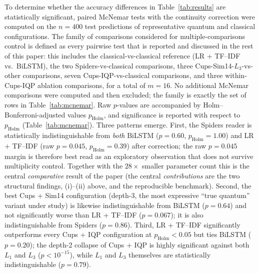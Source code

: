\documentclass[11pt, a4paper]{article}
\begin{document}
To determine whether the accuracy differences in
Table~\ref{tab:results} are statistically significant, paired McNemar
tests \citep{mcnemar1947} with the continuity correction were
computed on the \(n=400\) test predictions of representative
quantum and classical configurations. The family of comparisons
considered for multiple-comparisons control is defined as every
pairwise test that is reported and discussed in the rest of this
paper: this includes the classical-vs-classical reference
(LR + TF--IDF vs.\ BiLSTM), the two Spiders-vs-classical
comparisons, three Cups-Sim14-\(L_3\)-vs-other comparisons, seven
Cups-IQP-vs-classical comparisons, and three within-Cups-IQP
ablation comparisons, for a total of \(m=16\). No additional
McNemar comparisons were computed and then excluded; the family is
exactly the set of rows in Table~\ref{tab:mcnemar}. Raw
\(p\)-values are accompanied by Holm--Bonferroni-adjusted values
\(p_{\text{Holm}}\), and significance is reported with respect to
\(p_{\text{Holm}}\) (Table~\ref{tab:mcnemar}). Three
patterns emerge. First, the Spiders reader is statistically
indistinguishable from \emph{both} BiLSTM (\(p=0.60\),
\(p_{\text{Holm}}=1.00\)) and LR + TF--IDF (raw \(p=0.045\),
\(p_{\text{Holm}}=0.39\)) after correction; the raw \(p=0.045\)
margin is therefore best read as an exploratory observation that
does not survive multiplicity control. Together with the
\(28\times\) smaller parameter count this is the central
\emph{comparative} result of the paper (the central
\emph{contributions} are the two structural findings, (i)--(ii)
above, and the reproducible benchmark). Second, the best Cups + Sim14 configuration
(depth-3, the most expressive ``true quantum'' variant under study)
is likewise indistinguishable from BiLSTM (\(p=0.64\)) and not
significantly worse than LR + TF--IDF (\(p=0.067\)); it is also
indistinguishable from Spiders (\(p=0.86\)). Third, LR + TF--IDF
significantly outperforms every Cups + IQP configuration at
\(p_{\text{Holm}}<0.05\) but ties BiLSTM
(\(p=0.20\)); the depth-2 collapse of Cups + IQP is highly
significant against both \(L_1\) and \(L_3\) (\(p<10^{-15}\)),
while \(L_1\) and \(L_3\) themselves are statistically
indistinguishable (\(p=0.79\)).
\end{document}
